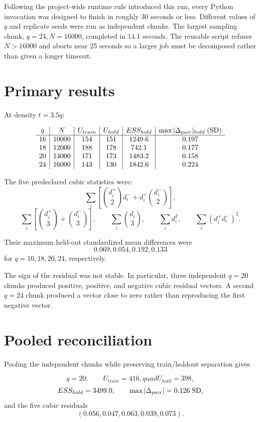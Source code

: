 \documentclass[11pt]{article}
\begin{document}
Following the project-wide runtime rule introduced this run, every Python
invocation was designed to finish in roughly 30 seconds or less.  Different
values of \(q\) and replicate seeds were run as independent chunks.
The largest sampling chunk, \(q=24,N=16000\), completed in 14.1 seconds.
The reusable script refuses \(N>16000\) and aborts near 25 seconds so a
larger job must be decomposed rather than given a longer timeout.

\section{Primary results}

At density \(t=3.5q\):

\[
\begin{array}{c|c|c|c|c|c}
q&N&U_{train}&U_{hold}&ESS_{hold}&
\max |\Delta_{pair}|_{hold}\;({\rm SD})\\
\hline
16&10000&154&151&1249.6&0.197\\
18&12000&188&178&742.1&0.177\\
20&14000&171&173&1483.2&0.158\\
24&16000&143&130&1842.6&0.224
\end{array}
\]

The five predeclared cubic statistics were:
\[
\sum_i\left[\binom{d_i^+}{2}d_i^-+d_i^+\binom{d_i^-}{2}\right],
\]
\[
\sum_i\left[\binom{d_i^+}{3}+\binom{d_i^-}{3}\right],
\qquad
\sum_i\binom{d_i}{3},
\qquad
\sum_i d_i^2,
\qquad
\sum_i(d_i^+d_i^-)^2.
\]

Their maximum held-out standardized mean differences were
\[
0.069, 0.054, 0.192, 0.133
\]
for \(q=16,18,20,24\), respectively.

The sign of the residual was not stable.  In particular, three independent
\(q=20\) chunks produced positive, positive, and negative cubic residual
vectors.  A second \(q=24\) chunk produced a vector close to zero rather
than reproducing the first negative vector.

\section{Pooled reconciliation}

Pooling the independent chunks while preserving train/holdout separation gives

\[
q=20:
\qquad
U_{train}=416,quad U_{hold}=398,
\]
\[
ESS_{hold}=3499.0,
\qquad
\max|\Delta_{pair}|=0.126\;{\rm SD},
\]
and the five cubic residuals
\[
(0.056,0.047,0.063,0.039,0.073).
\]
\end{document}
